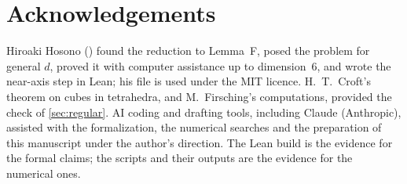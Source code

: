 \documentclass[11pt,a4paper]{article}
\begin{document}
\section*{Acknowledgements}
Hiroaki Hosono () found the reduction to Lemma~F, posed the problem for general $d$, proved it with computer assistance up to dimension~$6$, and wrote the near-axis step in Lean; his file is used under the MIT licence. H.~T.~Croft's theorem on cubes in tetrahedra, and M.~Firsching's computations, provided the check of \cref{sec:regular}. AI coding and drafting tools, including Claude (Anthropic), assisted with the formalization, the numerical searches and the preparation of this manuscript under the author's direction. The Lean build is the evidence for the formal claims; the scripts and their outputs are the evidence for the numerical ones.
\end{document}
